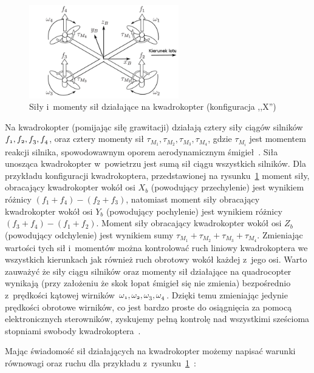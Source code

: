 \begin{figure}[H]
	\centering
		\includegraphics[width=0.58\textwidth]{Pictures/quadrotor_forces.png}
		\caption[Siły i~momenty sił działające na kwadrokopter]{Siły i~momenty sił działające na kwadrokopter (konfiguracja ,,X'')~\cite{quadro7}}
	\label{fig:quadrotor_forces}
\end{figure}


Na kwadrokopter (pomijając siłę grawitacji) działają cztery siły ciągów silników $\mathnormal{f_1, f_2, f_3, f_4}$, oraz cztery momenty sił $\tau_{M_1}, \tau_{M_2}, \tau_{M_3}, \tau_{M_4}$, gdzie $\tau_{M_i}$ jest momentem reakcji silnika, spowodowawnym oporem aerodynamicznym śmigieł~\cite{quadro8, quadro9}. 
Siła unosząca kwadrokopter w~powietrzu jest sumą sił ciągu wszystkich silników. Dla przykładu konfiguracji kwadrokoptera, przedstawionej na rysunku~\ref{fig:quadrotor_forces} moment siły, obracający kwadrokopter wokół osi $X_b$ (powodujący przechylenie) jest wynikiem różnicy $(f_1 + f_4) - (f_2 + f_3)$, natomiast moment siły obracający kwadrokopter wokół osi $Y_b$ (powodujący pochylenie) jest wynikiem różnicy $(f_3 + f_4) - (f_1 + f_2)$. 
Moment siły obracający kwadrokopter wokół osi $Z_b$ (powodujący odchylenie) jest wynikiem sumy $\tau_{M_1} + \tau_{M_2} + \tau_{M_3} + \tau_{M_4}$.  Zmieniając wartości tych sił i~momentów można kontrolować ruch liniowy kwadrokoptera we wszystkich kierunkach jak również ruch obrotowy wokół każdej z~jego osi. Warto zauważyć że siły ciągu silników oraz momenty sił działające na quadrocopter wynikają (przy założeniu że skok łopat śmigieł się nie zmienia) bezpośrednio z~prędkości kątowej wirników $\mathnormal{\omega_1, \omega_2, \omega_3, \omega_4}$. Dzięki temu zmieniając jedynie prędkości obrotowe wirników, co jest bardzo proste do osiągnięcia za pomocą elektronicznych sterowników, zyskujemy pełną kontrolę nad wszystkimi sześcioma stopniami swobody kwadrokoptera~\cite{quadro8}.  

Mając świadomość sił działających na kwadrokopter możemy napisać warunki równowagi oraz ruchu dla przykładu z~rysunku~\ref{fig:quadrotor_forces}~\cite{quadro8, quadro9}:

